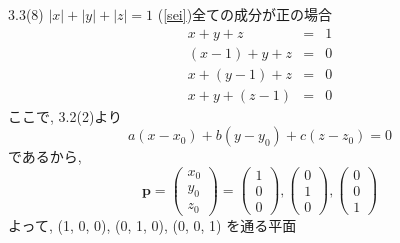 \documentclass{beamer}
\begin{document}
\begin{frame}{3.3(8) $|x| + |y| + |z|  = 1$ \hspace{5mm} (\ref{sei})全ての成分が正の場合}
  \begin{eqnarray*}
    x + y + z &=& 1\\
    (x-1) + y + z &=& 0\\
    x + (y-1) + z &=& 0\\
    x + y + (z-1) &=& 0
  \end{eqnarray*}
  ここで, 3.2(2)より
  \begin{equation*}
    a(x-x_0) + b(y-y_0) + c(z-z_0) = 0
  \end{equation*}
  であるから,
  \begin{equation*}
    \bm{p} = 
    \begin{pmatrix}
      x_0\\
      y_0\\
      z_0
    \end{pmatrix} =
    \begin{pmatrix}
      1\\
      0\\
      0
    \end{pmatrix} , 
    \begin{pmatrix}
      0\\
      1\\
      0
    \end{pmatrix} , 
    \begin{pmatrix}
      0\\
      0\\
      1
    \end{pmatrix} 
  \end{equation*}
  よって, (1, 0, 0), (0, 1, 0), (0, 0, 1) を通る平面
\end{frame}
\end{document}

